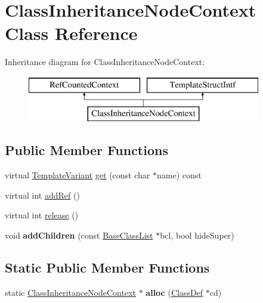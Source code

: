 \hypertarget{class_class_inheritance_node_context}{}\section{Class\+Inheritance\+Node\+Context Class Reference}
\label{class_class_inheritance_node_context}
Inheritance diagram for Class\+Inheritance\+Node\+Context\+:\begin{figure}[H]
\begin{center}
\leavevmode
\includegraphics[height=2.000000cm]{class_class_inheritance_node_context}
\end{center}
\end{figure}
\subsection*{Public Member Functions}
\begin{DoxyCompactItemize}
\item 
virtual \mbox{\hyperlink{class_template_variant}{Template\+Variant}} \mbox{\hyperlink{class_class_inheritance_node_context_a7c30015b546f363391346c86fcf2c51d}{get}} (const char $\ast$name) const
\item 
virtual int \mbox{\hyperlink{class_class_inheritance_node_context_a657382620f42bf8cf7119c647930c0ec}{add\+Ref}} ()
\item 
virtual int \mbox{\hyperlink{class_class_inheritance_node_context_adb0ebd43b613667b492399bbeef87ef1}{release}} ()
\item 
\mbox{\label{class_class_inheritance_node_context_aea17061580ccef279863ef2e15499d52}} 
void {\bfseries add\+Children} (const \mbox{\hyperlink{class_base_class_list}{Base\+Class\+List}} $\ast$bcl, bool hide\+Super)
\end{DoxyCompactItemize}
\subsection*{Static Public Member Functions}
\begin{DoxyCompactItemize}
\item 
\mbox{\label{class_class_inheritance_node_context_a64ec6ac918a696dafb83cf204e12a3a2}} 
static \mbox{\hyperlink{class_class_inheritance_node_context}{Class\+Inheritance\+Node\+Context}} $\ast$ {\bfseries alloc} (\mbox{\hyperlink{class_class_def}{Class\+Def}} $\ast$cd)
\end{DoxyCompactItemize}


